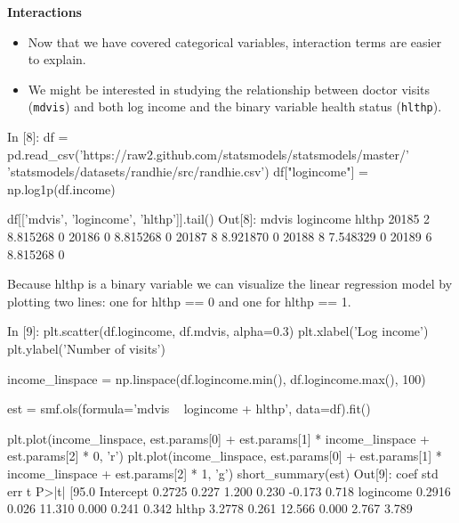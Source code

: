 \begin{frame}[fragile]
	\Large
\textbf{Interactions}
\begin{itemize}
\item Now that we have covered categorical variables, interaction terms are easier to explain.

\item We might be interested in studying the relationship between doctor visits (\texttt{mdvis}) and both log income and the binary variable health status (\texttt{hlthp}).
\end{itemize}

\end{frame}

\begin{frame}[fragile]
	\Large
In [8]:
df = pd.read_csv('https://raw2.github.com/statsmodels/statsmodels/master/'
                 'statsmodels/datasets/randhie/src/randhie.csv')
df["logincome"] = np.log1p(df.income)

df[['mdvis', 'logincome', 'hlthp']].tail()
Out[8]:
mdvis	logincome	hlthp
20185	2	8.815268	0
20186	0	8.815268	0
20187	8	8.921870	0
20188	8	7.548329	0
20189	6	8.815268	0
\end{frame}

\begin{frame}[fragile]
	\Large
Because hlthp is a binary variable we can visualize the linear regression model by plotting two lines: one for hlthp == 0 and one for hlthp == 1.
\end{frame}

\begin{frame}[fragile]
	\Large
In [9]:
plt.scatter(df.logincome, df.mdvis, alpha=0.3)
plt.xlabel('Log income')
plt.ylabel('Number of visits')

income_linspace = np.linspace(df.logincome.min(), df.logincome.max(), 100)

est = smf.ols(formula='mdvis ~ logincome + hlthp', data=df).fit()
\end{frame}

\begin{frame}[fragile]
	\Large
plt.plot(income_linspace, est.params[0] + est.params[1] * income_linspace + est.params[2] * 0, 'r')
plt.plot(income_linspace, est.params[0] + est.params[1] * income_linspace + est.params[2] * 1, 'g')
short_summary(est)
Out[9]:
coef	std err	t	P>|t|	[95.0%
Intercept	0.2725	0.227	1.200	0.230	-0.173 0.718
logincome	0.2916	0.026	11.310	0.000	0.241 0.342
hlthp	3.2778	0.261	12.566	0.000	2.767 3.789
\end{frame}

